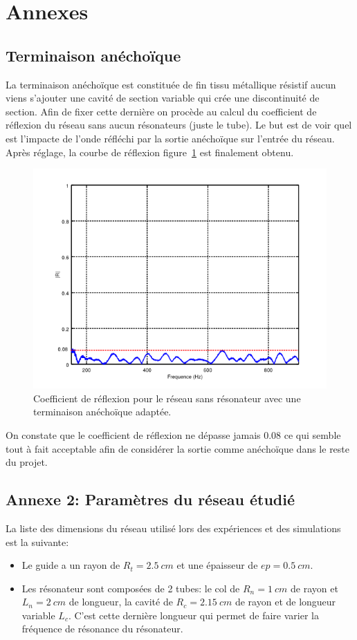 \chapter*{Annexes}

\section*{Terminaison anéchoïque}
\label{term_anecho}
La terminaison anéchoïque est constituée de fin tissu métallique résistif aucun viens s'ajouter une cavité de section variable qui crée une discontinuité de section. Afin de fixer cette dernière on procède au calcul du coefficient de réflexion du réseau sans aucun résonateurs (juste le tube). Le but est de voir quel est l'impacte de l'onde réfléchi par la sortie anéchoïque sur l'entrée du réseau. Après réglage, la courbe de réflexion figure~\ref{fig_term_anecho} est finalement obtenu.

\begin{figure}
\centering
\includegraphics[scale=0.5]{./images_annexe/anecho.png}
\caption{\label{fig_term_anecho} Coefficient de réflexion pour le réseau sans résonateur avec une terminaison anéchoïque adaptée.}
\end{figure}

On constate que le coefficient de réflexion ne dépasse jamais 0.08 ce qui semble tout à fait acceptable afin de considérer la sortie comme anéchoïque dans le reste du projet.

\section*{Annexe 2: Paramètres du réseau étudié }
La liste des dimensions du réseau utilisé lors des expériences et des simulations est la suivante:
\begin{itemize}
\item Le guide a un rayon de $R_t = 2.5~cm$ et une épaisseur de $ep = 0.5~cm$.
\item Les résonateur sont composées de 2 tubes: le col de $R_n = 1~cm$ de rayon et $L_n = 2~cm$ de longueur, la cavité de $R_c = 2.15~cm$ de rayon et de longueur variable $L_c$. C'est cette dernière longueur qui permet de faire varier la fréquence de résonance du résonateur. 
\end{itemize}

